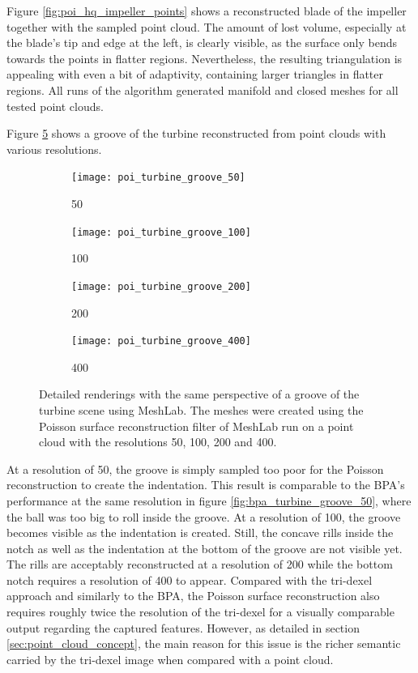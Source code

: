 Figure \ref{fig:poi_hq_impeller_points} shows a reconstructed blade of the impeller together with the sampled point cloud.
The amount of lost volume, especially at the blade's tip and edge at the left, is clearly visible, as the surface only bends towards the points in flatter regions.
Nevertheless, the resulting triangulation is appealing with even a bit of adaptivity, containing larger triangles in flatter regions.
All runs of the algorithm generated manifold and closed meshes for all tested point clouds.

Figure \ref{fig:poi_grooves} shows a groove of the turbine reconstructed from point clouds with various resolutions.
%
\begin{figure}
	\begin{subfigure}[b]{0.24\textwidth}
		\centering
		\texttt{[image: poi\_turbine\_groove\_50]}
		\caption{50}
		\label{fig:poi_turbine_groove_50}
	\end{subfigure}
	\begin{subfigure}[b]{0.24\textwidth}
		\centering
		\texttt{[image: poi\_turbine\_groove\_100]}
		\caption{100}
		\label{fig:poi_turbine_groove_100}
	\end{subfigure}
	\begin{subfigure}[b]{0.24\textwidth}
		\centering
		\texttt{[image: poi\_turbine\_groove\_200]}
		\caption{200}
		\label{fig:poi_turbine_groove_200}
	\end{subfigure}
	\begin{subfigure}[b]{0.24\textwidth}
		\centering
		\texttt{[image: poi\_turbine\_groove\_400]}
		\caption{400}
		\label{fig:poi_turbine_groove_400}
	\end{subfigure}
	\caption{
		Detailed renderings with the same perspective of a groove of the turbine scene using MeshLab.
		The meshes were created using the Poisson surface reconstruction filter of MeshLab run on a point cloud with the resolutions 50, 100, 200 and 400.
	}
	\label{fig:poi_grooves}
\end{figure}
%
At a resolution of 50, the groove is simply sampled too poor for the Poisson reconstruction to create the indentation.
This result is comparable to the BPA's performance at the same resolution in figure \ref{fig:bpa_turbine_groove_50}, where the ball was too big to roll inside the groove.
At a resolution of 100, the groove becomes visible as the indentation is created.
Still, the concave rills inside the notch as well as the indentation at the bottom of the groove are not visible yet.
The rills are acceptably reconstructed at a resolution of 200 while the bottom notch requires a resolution of 400 to appear.
Compared with the tri-dexel approach and similarly to the BPA, the Poisson surface reconstruction also requires roughly twice the resolution of the tri-dexel for a visually comparable output regarding the captured features.
However, as detailed in section \ref{sec:point_cloud_concept}, the main reason for this issue is the richer semantic carried by the tri-dexel image when compared with a point cloud.

